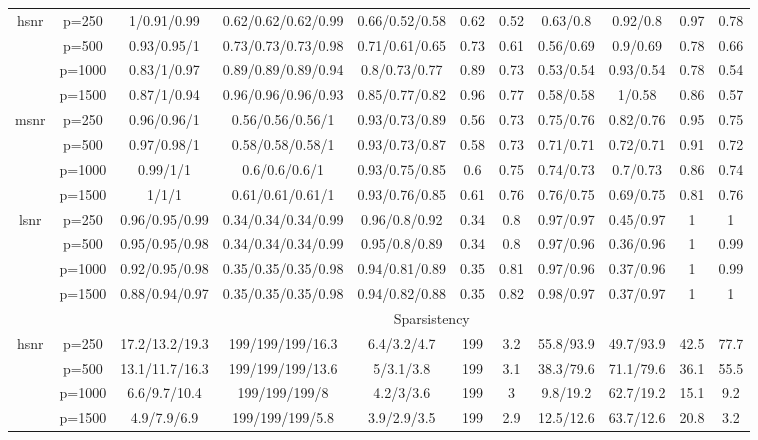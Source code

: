\begin{table}[ht]
{\begin{tabular}{|c|c|ccccccccc|}
\midrule\multirow{4}[2]{*}{hsnr} & p=250 & 1/0.91/0.99 & 0.62/0.62/0.62/0.99 & 0.66/0.52/0.58 & 0.62 & 0.52 & 0.63/0.8 & 0.92/0.8 & 0.97 & 0.78 \\ 
   & p=500 & 0.93/0.95/1 & 0.73/0.73/0.73/0.98 & 0.71/0.61/0.65 & 0.73 & 0.61 & 0.56/0.69 & 0.9/0.69 & 0.78 & 0.66 \\ 
   & p=1000 & 0.83/1/0.97 & 0.89/0.89/0.89/0.94 & 0.8/0.73/0.77 & 0.89 & 0.73 & 0.53/0.54 & 0.93/0.54 & 0.78 & 0.54 \\ 
   & p=1500 & 0.87/1/0.94 & 0.96/0.96/0.96/0.93 & 0.85/0.77/0.82 & 0.96 & 0.77 & 0.58/0.58 & 1/0.58 & 0.86 & 0.57 \\ 
  \midrule\multirow{4}[2]{*}{msnr} & p=250 & 0.96/0.96/1 & 0.56/0.56/0.56/1 & 0.93/0.73/0.89 & 0.56 & 0.73 & 0.75/0.76 & 0.82/0.76 & 0.95 & 0.75 \\ 
   & p=500 & 0.97/0.98/1 & 0.58/0.58/0.58/1 & 0.93/0.73/0.87 & 0.58 & 0.73 & 0.71/0.71 & 0.72/0.71 & 0.91 & 0.72 \\ 
   & p=1000 & 0.99/1/1 & 0.6/0.6/0.6/1 & 0.93/0.75/0.85 & 0.6 & 0.75 & 0.74/0.73 & 0.7/0.73 & 0.86 & 0.74 \\ 
   & p=1500 & 1/1/1 & 0.61/0.61/0.61/1 & 0.93/0.76/0.85 & 0.61 & 0.76 & 0.76/0.75 & 0.69/0.75 & 0.81 & 0.76 \\ 
  \midrule\multirow{4}[2]{*}{lsnr} & p=250 & 0.96/0.95/0.99 & 0.34/0.34/0.34/0.99 & 0.96/0.8/0.92 & 0.34 & 0.8 & 0.97/0.97 & 0.45/0.97 & 1 & 1 \\ 
   & p=500 & 0.95/0.95/0.98 & 0.34/0.34/0.34/0.99 & 0.95/0.8/0.89 & 0.34 & 0.8 & 0.97/0.96 & 0.36/0.96 & 1 & 0.99 \\ 
   & p=1000 & 0.92/0.95/0.98 & 0.35/0.35/0.35/0.98 & 0.94/0.81/0.89 & 0.35 & 0.81 & 0.97/0.96 & 0.37/0.96 & 1 & 0.99 \\ 
   & p=1500 & 0.88/0.94/0.97 & 0.35/0.35/0.35/0.98 & 0.94/0.82/0.88 & 0.35 & 0.82 & 0.98/0.97 & 0.37/0.97 & 1 & 1 \\ 
   \midrule 
 \multicolumn{1}{|c}{} &       & \multicolumn{9}{c|}{Sparsistency} \\
\midrule\multirow{4}[2]{*}{hsnr} & p=250 & 17.2/13.2/19.3 & 199/199/199/16.3 & 6.4/3.2/4.7 & 199 & 3.2 & 55.8/93.9 & 49.7/93.9 & 42.5 & 77.7 \\ 
   & p=500 & 13.1/11.7/16.3 & 199/199/199/13.6 & 5/3.1/3.8 & 199 & 3.1 & 38.3/79.6 & 71.1/79.6 & 36.1 & 55.5 \\ 
   & p=1000 & 6.6/9.7/10.4 & 199/199/199/8 & 4.2/3/3.6 & 199 & 3 & 9.8/19.2 & 62.7/19.2 & 15.1 & 9.2 \\ 
   & p=1500 & 4.9/7.9/6.9 & 199/199/199/5.8 & 3.9/2.9/3.5 & 199 & 2.9 & 12.5/12.6 & 63.7/12.6 & 20.8 & 3.2 \\ 

\end{tabular}}
\end{table}
